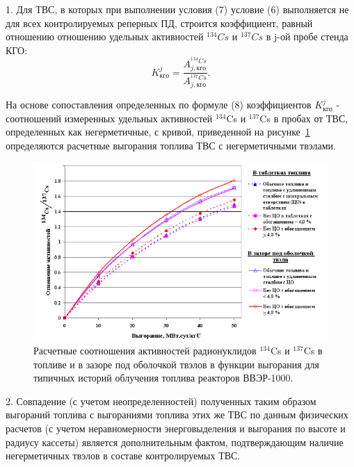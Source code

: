 1. Для ТВС, в которых при выполнении условия (7) условие (6)
выполняется не для всех контролируемых реперных ПД, строится
коэффициент, равный отношению отношению удельных активностей $^{134}Cs$ и
$^{137}Cs$ в j-ой пробе стенда КГО:
\begin{equation} \label{eq:Kcs}
	{K}_{кго}^{j} = \frac{A_{j,кго}^{^{134}Cs}}{A_{j,кго}^{^{137}Cs}}.
\end{equation}

На основе сопоставления определенных по формуле (8)
коэффициентов ${K}_{кго}^{j}$ - соотношений измеренных удельных активностей $^{134}$Cs и $^{137}$Cs в пробах от ТВС, определенных как негерметичные, с кривой, приведенной на рисунке~\ref{fig:ris3} определяются расчетные выгорания топлива ТВС с негерметичными твэлами.

\begin{figure}[H]
	\centering
	\includegraphics[width=1\linewidth]{pics/ris3} %
	\caption{Расчетные соотношения активностей радионуклидов $^{134}$Cs и $^{137}$Cs в топливе и в зазоре под оболочкой твэлов в функции выгорания для типичных историй облучения топлива реакторов ВВЭР-1000.~\cite{RD}}
	\label{fig:ris3} %
\end{figure}

2. Совпадение (с учетом неопределенностей) полученных таким образом
выгораний топлива с выгораниями топлива этих же ТВС по данным
физических расчетов (с учетом неравномерности энерговыделения и
выгорания по высоте и радиусу кассеты) является дополнительным фактом,
подтверждающим наличие негерметичных твэлов в составе контролируемых
ТВС.